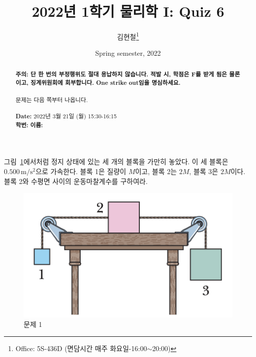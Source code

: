 \documentclass[floatfix,nofootinbib,superscriptaddress,fleqn,preprint]{revtex4}
\begin{document}
\title{\Large 2022년 1학기 물리학 I: Quiz 6}
\author{김현철\footnote{Office: 5S-436D (면담시간 매주
    화요일-16:00$\sim$20:00)}} 
\date{Spring semester, 2022}


\vspace{1.cm}
\begin{abstract}
\noindent \textbf{ {\color{red}주의}: \color{blue} 단 한 번의 부정행위도 절대
  용납하지 않습니다. 적발 시, 학점은 F를 받게 됨은 물론이고,
  징계위원회에 회부합니다. One strike out임을 명심하세요.}\\
\\
문제는 다음 쪽부터 나옵니다.  \\ \\
{\bf Date:} 2022년 3월 21일 (월) 15:30-16:15 
\\
{\bf 학번:} \hspace{4cm}
{\bf 이름:} 

\end{abstract}
\maketitle

그림~\ref{fig:1}에서처럼 정지 상태에 있는 세 개의 블록을 가만히
놓았다. 이 세 블록은 $0.500\,\mathrm{m/s^2}$으로 가속한다. 블록 1은
질량이 $M$이고, 블록 2는 $2M$, 블록 3은 $2M$이다. 블록 2와 수평면
사이의 운동마찰계수를 구하여라.
\begin{figure}[ht]
  \centering
\includegraphics[scale=0.43]{Qfig6-1-20220321.png}  
  \caption{문제 1}
  \label{fig:1}
\end{figure}
\end{document}

